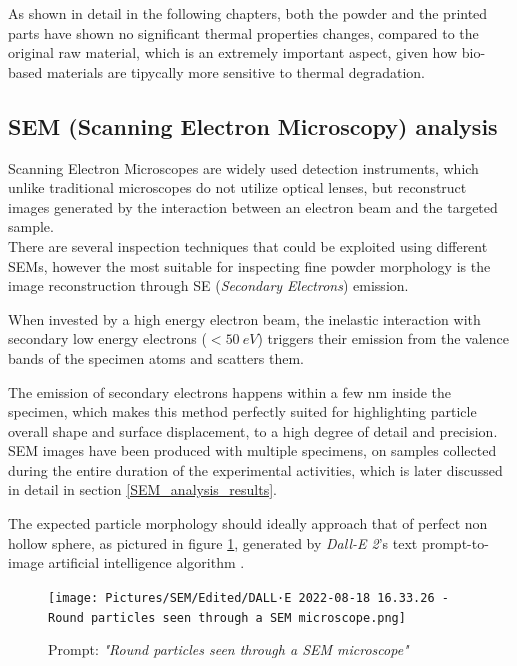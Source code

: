 \documentclass{article}
\begin{document}
    As shown in detail in the following chapters, both the powder and the printed parts have shown no significant thermal properties changes, compared to the 
    original raw material, which is an extremely important aspect, given how bio-based materials are tipycally more sensitive to thermal degradation. \\ 


    \clearpage
        \subsection{SEM (Scanning Electron Microscopy) analysis\label{SEM_analysis}}

        Scanning Electron Microscopes are widely used detection instruments, which unlike traditional microscopes 
        do not utilize optical lenses, but reconstruct images generated by the interaction between an electron beam and the targeted 
        sample. \\ 

        There are several inspection techniques that could be exploited using different SEMs, however the most suitable for inspecting 
        fine powder morphology is the image reconstruction through SE (\textit{Secondary Electrons}) emission. 

        When invested by a high energy electron beam, the inelastic interaction with secondary low energy electrons ($< 50 \ eV$) triggers their emission from the valence bands of the specimen atoms and scatters them. 

        The emission of secondary electrons happens within a few nm inside the specimen, which makes this method perfectly suited 
        for highlighting particle overall shape and surface displacement, to a high degree of detail and precision. \\

        SEM images have been produced with multiple specimens, on samples collected during the entire duration of the experimental 
        activities, which is later discussed in detail in section \ref{SEM_analysis_results}. 

        The expected particle morphology should ideally approach that of perfect non hollow sphere, as pictured in figure \ref{fig:SEM_DALLE2}, generated by \textit{Dall-E 2}'s 
        text prompt-to-image artificial intelligence algorithm \autocites{DALLE2}{DALLE2_roundparticles}. 

            \begin{figure}[h!]
                \centering
                \texttt{[image: Pictures/SEM/Edited/DALL·E 2022-08-18 16.33.26 - Round particles seen through a SEM microscope.png]}
                \caption{Prompt: \textit{"Round particles seen through a SEM microscope"}}
                \label{fig:SEM_DALLE2}
            \end{figure}
\end{document}
